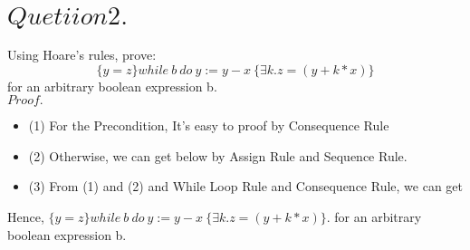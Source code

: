 \documentclass[a4paper,11pt,fleqn]{article}
\theoremstyle{mytheor}
\begin{document}
\section*{$Quetiion 2.$}
Using Hoare’s rules, prove:
$$\{y=z\}while\ b\ do\ y:=y-x\ \{\exists k.z=(y+k*x) \}$$
for an arbitrary boolean expression b.\\
$Proof.$ 
\begin{itemize}
\item(1) For the Precondition, It's easy to proof by Consequence Rule\\
\begin{prooftree}
\end{prooftree}
\item(2) Otherwise, we can get below by Assign Rule and Sequence Rule.\\
\begin{changemargin}{-2cm}{0cm}
\begin{prooftree}
\end{prooftree}
\end{changemargin}
\begin{changemargin}{-1.5cm}{0cm}
\begin{prooftree}
\end{prooftree}
\end{changemargin}
\item(3) From (1) and (2) and While Loop Rule and Consequence Rule, we can get\\
\begin{prooftree}
\end{prooftree}
\end{itemize}
Hence, $\{y=z\}while\ b\ do\ y:=y-x\ \{\exists k.z=(y+k*x) \}$. for an arbitrary boolean expression b.\\
\end{document}
